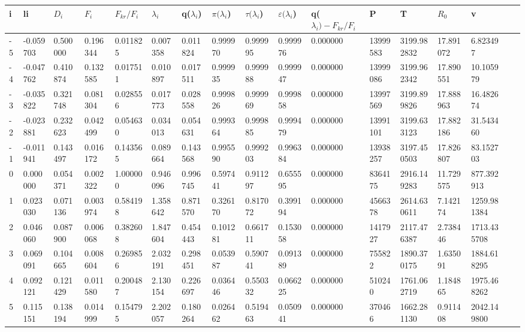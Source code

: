 \begin{center}
\begin{tabular}{|l*{16}{l|}}
\hline
i & li & \(D_i\) & \(F_i\) & \(F_{kr}/F_i\) & $\lambda_i$ & q($\lambda_i$) & $\pi(\lambda_i$) & $\tau(\lambda_i$) & $\varepsilon(\lambda_i$) & q($\lambda_i) - F_{kr}/F_i$ & P & T & \(R_0\) & v  \\
\hline
-5 & -0.059703 & 0.500000 & 0.196344 & 0.011825 & 0.007358 & 0.011824 & 0.999970 & 0.999995 & 0.999976 & 0.000000 & 13999583 & 3199.982832 & 17.891072 & 6.823497 \\
-4 & -0.047762 & 0.410874 & 0.132585 & 0.017511 & 0.010897 & 0.017511 & 0.999935 & 0.999988 & 0.999947 & 0.000000 & 13999086 & 3199.962342 & 17.890551 & 10.105979 \\
-3 & -0.035822 & 0.321748 & 0.081304 & 0.028556 & 0.017773 & 0.028558 & 0.999826 & 0.999969 & 0.999858 & 0.000000 & 13997569 & 3199.899826 & 17.888963 & 16.482674 \\
-2 & -0.023881 & 0.232623 & 0.042499 & 0.054630 & 0.034013 & 0.054631 & 0.999364 & 0.999885 & 0.999479 & 0.000000 & 13991101 & 3199.633123 & 17.882186 & 31.543460 \\
-1 & -0.011941 & 0.143497 & 0.016172 & 0.143565 & 0.089664 & 0.143568 & 0.995590 & 0.999203 & 0.996384 & 0.000000 & 13938257 & 3197.450503 & 17.826807 & 83.152703 \\
0 & 0.000000 & 0.054371 & 0.002322 & 1.000000 & 0.946096 & 0.996745 & 0.597441 & 0.911297 & 0.655595 & 0.000000 & 8364175 & 2916.149283 & 11.729575 & 877.392913 \\
1 & 0.023030 & 0.071136 & 0.003974 & 0.584198 & 1.358642 & 0.871570 & 0.326170 & 0.817072 & 0.399194 & 0.000000 & 4566378 & 2614.630611 & 7.142174 & 1259.981384 \\
2 & 0.046060 & 0.087900 & 0.006068 & 0.382608 & 1.847604 & 0.454443 & 0.101281 & 0.661711 & 0.153058 & 0.000000 & 1417927 & 2117.476387 & 2.738446 & 1713.435708 \\
3 & 0.069091 & 0.104665 & 0.008604 & 0.269856 & 2.032191 & 0.298451 & 0.053987 & 0.590741 & 0.091389 & 0.000000 & 755822 & 1890.370175 & 1.635091 & 1884.618295 \\
4 & 0.092121 & 0.121429 & 0.011580 & 0.200487 & 2.130154 & 0.226697 & 0.036446 & 0.550332 & 0.066225 & 0.000000 & 510240 & 1761.062719 & 1.184865 & 1975.468262 \\
5 & 0.115151 & 0.138194 & 0.014999 & 0.154795 & 2.202057 & 0.180264 & 0.026462 & 0.519463 & 0.050941 & 0.000000 & 370466 & 1662.281130 & 0.911408 & 2042.149800 \\

\end{tabular}
\end{center}
